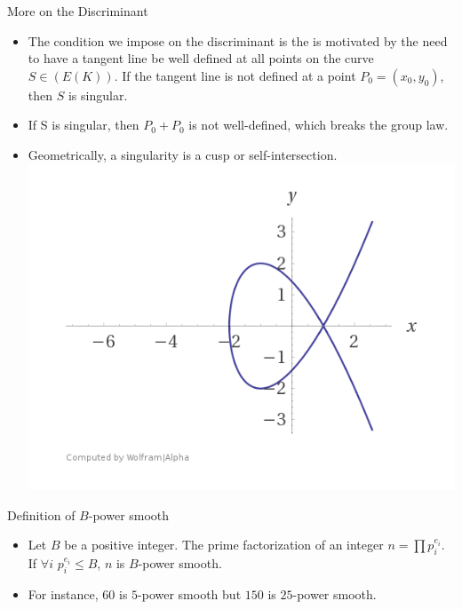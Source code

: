 \documentclass{beamer}
\begin{document}
		\begin{frame}{More on the Discriminant}
		\begin{itemize}
			\item The condition we impose on the discriminant is the is motivated by the need to have a tangent line be well defined at all points on the curve $S\in(E(K))$. If the tangent line is not defined at a point $P_0=(x_0,y_0)$, then $S$ is singular.
			\item If S is singular, then $P_0+P_0$ is not well-defined, which breaks the group law.
			\item Geometrically, a singularity is a cusp or self-intersection.
			\newline \includegraphics[scale=.3]{SingularCurve.png}
		\end{itemize}
	\end{frame}
	
	\begin{frame}{Definition of $B$-power smooth}
		\begin{itemize}
			\item Let $B$ be a positive integer. The prime factorization of an integer $n=\prod p_{i}^{e_{i}}$. If $\forall i$ $p_{i}^{e_{i}} \leq B$, $n$ is $B$-power smooth.
			\item For instance, $60$ is $5$-power smooth but $150$ is $25$-power smooth.
		\end{itemize}
	\end{frame}
	
\end{document}
